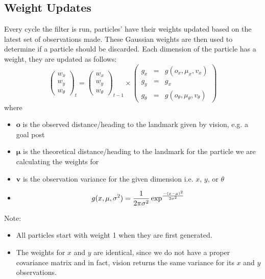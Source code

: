 \documentclass[pdftex,11pt,a4paper]{report}
\begin{document}
\subsection{Weight Updates} \label{subsecWeightUpdates}
Every cycle the filter is run, particles' have their weights updated based on the latest set of observations made. These Gaussian weights are then used to determine if a particle should be discarded. Each dimension of the particle has a weight, they are updated as follows: 
\begin{equation}
  \begin{pmatrix}
    w_x \\
    w_y \\
    w_\theta
  \end{pmatrix}_t
  =
  \begin{pmatrix}
    w_x \\
    w_y \\
    w_\theta
  \end{pmatrix}_{t-1}
  \times
  \begin{pmatrix}
    g_x &=& g(o_x, \mu_x, v_x)\\
    g_y &=& g_x \\
    g_\theta &=& g(o_\theta, \mu_\theta, v_\theta)
  \end{pmatrix}
\end{equation}
where
\begin{itemize}
  \item $\mathbf{o}$ is the observed distance/heading to the landmark given by vision, e.g. a goal post
  \item $\mathbf{\mu}$ is the theoretical distance/heading to the landmark for the particle we are calculating the weights for
  \item $\mathbf{v}$ is the observation variance for the given dimension i.e. $x$, $y$, or $\theta$
  \item
\begin{equation}
  g(x, \mu, \sigma^2) = \frac{1}{2\pi\sigma^2}\exp^{\frac{-(x - \mu)^2}{2\sigma^2}} \\
\end{equation}
\end{itemize}
Note: 
\begin{itemize}
  \item All particles start with weight 1 when they are first generated.
  \item The weights for $x$ and $y$ are identical, since we do not have a proper covariance matrix and in fact, vision returns the same variance for its $x$ and $y$ observations. 
\end{itemize}
\end{document}
